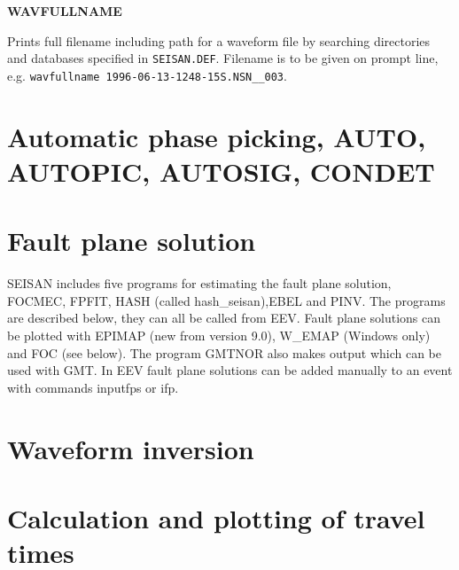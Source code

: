 \textbf{WAVFULLNAME}

Prints full filename including path for a waveform 
file by searching directories and databases specified in 
\texttt{SEISAN.DEF}. Filename is to be given on prompt line, e.g. 
\texttt{wavfullname 1996-06-13-1248-15S.NSN\_\_003}. 






\section{Automatic phase picking, AUTO, AUTOPIC, AUTOSIG, CONDET}
\label{sect:auto-p-pick}





\section{Fault plane solution}
\label{sect:fps}
SEISAN includes 
five programs for estimating the fault plane solution, 
FOCMEC, FPFIT, HASH (called hash\_seisan),EBEL and PINV. The programs are described below, 
they can all be called from EEV. Fault plane solutions can be plotted 
with EPIMAP (new from version 9.0), W\_EMAP (Windows only) and FOC 
(see below). The program GMTNOR also makes output which can be used with GMT.
In EEV fault plane solutions can be added manually to an event with commands inputfps or ifp.







\section{Waveform inversion}






\section{Calculation and plotting of travel times} 
\label{sect:cal-plot-tt}

